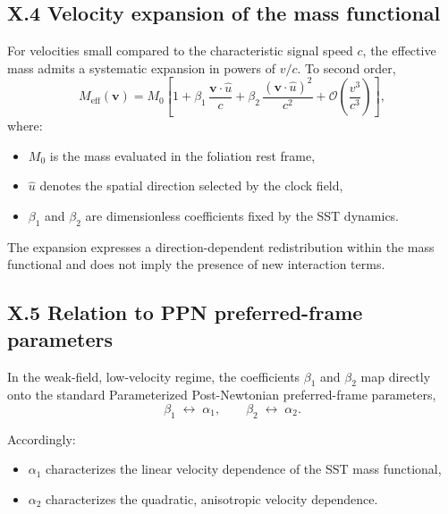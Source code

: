 \documentclass[10pt]{article}
\begin{document}
    \subsection*{X.4 Velocity expansion of the mass functional}

        For velocities small compared to the characteristic signal speed $c$,
        the effective mass admits a systematic expansion in powers of $v/c$.
        To second order,
        \begin{equation}
            M_{\mathrm{eff}}(\mathbf{v})
            =
            M_0
            \left[
                1
                + \beta_1 \, \frac{\mathbf{v}\!\cdot\!\hat{u}}{c}
                + \beta_2 \, \frac{(\mathbf{v}\!\cdot\!\hat{u})^2}{c^2}
                + \mathcal{O}\!\left(\frac{v^3}{c^3}\right)
            \right],
        \end{equation}
        where:
        \begin{itemize}
            \item $M_0$ is the mass evaluated in the foliation rest frame,
            \item $\hat{u}$ denotes the spatial direction selected by the clock field,
            \item $\beta_1$ and $\beta_2$ are dimensionless coefficients fixed by the SST
            dynamics.
        \end{itemize}

        The expansion expresses a direction-dependent redistribution within the mass
        functional and does not imply the presence of new interaction terms.

    \subsection*{X.5 Relation to PPN preferred-frame parameters}

        In the weak-field, low-velocity regime, the coefficients $\beta_1$ and $\beta_2$
        map directly onto the standard Parameterized Post-Newtonian preferred-frame
        parameters,
        \begin{equation}
            \beta_1 \;\leftrightarrow\; \alpha_1,
            \qquad
            \beta_2 \;\leftrightarrow\; \alpha_2 .
        \end{equation}

        Accordingly:
        \begin{itemize}
            \item $\alpha_1$ characterizes the linear velocity dependence of the SST mass
            functional,
            \item $\alpha_2$ characterizes the quadratic, anisotropic velocity dependence.
        \end{itemize}
\end{document}
